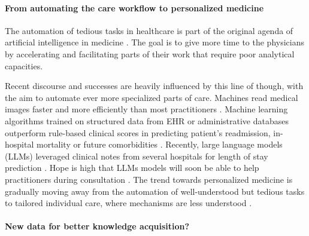 \documentclass[french,12pt,twoside,a4paper]{book}
\begin{document}

\paragraph{From automating the care workflow to personalized medicine}

The automation of tedious tasks in healthcare is part of the original agenda of
artificial intelligence in medicine \citep{schwartz1987artificial}. The goal is to give more time to the
physicians by accelerating and facilitating parts of their work that require
poor analytical capacities.

Recent discourse and successes are heavily influenced by this line of though,
with the aim to automate ever more specialized parts of care. Machines read
medical images faster and more efficiently than most practitioners
\citep{zhou2021review}. Machine learning algorithms trained on structured data
from EHR \citep{rajkomar2018scalable} or administrative
databases \citep{beaulieu2021machine} outperform rule-based clinical scores in
predicting patient's readmission, in-hospital mortality or future comorbidities
\citep{li2020behrt}. Recently, large language models (LLMs) leveraged clinical
notes from several hospitals for length of stay prediction
\citep{jiang2023health}. Hope is high that LLMs models will soon be able to help
practitioners during consultation \citep{lee2023benefits}. The trend towards
personalized medicine is gradually moving away from the automation of
well-understood but tedious tasks to tailored individual care, where mechanisms
are less understood \citep{schork2015personalized, topol2019high}.

\paragraph{New data for better knowledge acquisition?}
\end{document}

